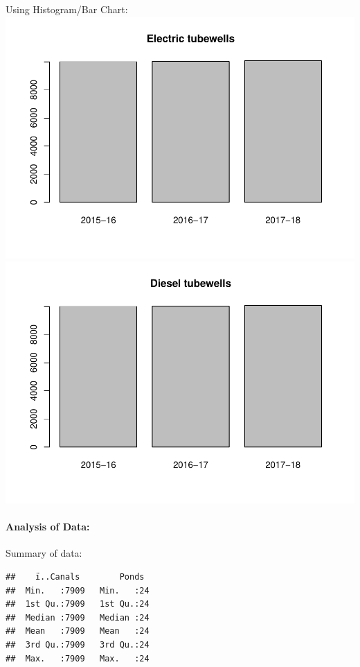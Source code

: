 \documentclass[]{article}
\let\oldparagraph\paragraph
\renewcommand{\paragraph}[1]{\oldparagraph{#1}\mbox{}}
\begin{document}
Using Histogram/Bar Chart:
\includegraphics{Report_files/figure-latex/unnamed-chunk-35-1.pdf}
\includegraphics{Report_files/figure-latex/unnamed-chunk-35-2.pdf}

\paragraph{Analysis of Data:}\label{analysis-of-data-8}

Summary of data:

\begin{verbatim}
##    ï..Canals        Ponds   
##  Min.   :7909   Min.   :24  
##  1st Qu.:7909   1st Qu.:24  
##  Median :7909   Median :24  
##  Mean   :7909   Mean   :24  
##  3rd Qu.:7909   3rd Qu.:24  
##  Max.   :7909   Max.   :24
\end{verbatim}
\end{document}
